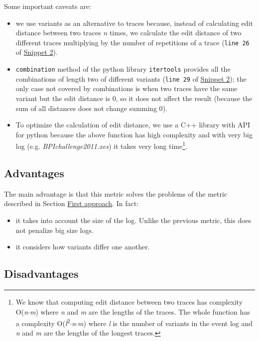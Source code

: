 \documentclass[12pt]{article}
\begin{document}
\noindent Some important caveats are:
\begin{itemize}
	\item we use variants as an alternative to traces because, instead of calculating edit distance between two traces \textit{n} times, we calculate the edit distance of two different traces multiplying by the number of repetitions of a trace (\texttt{line 26} of \hyperref[code:code2]{Snippet 2}).
	\item \texttt{combination} method of the python library \texttt{itertools} provides all the combinations of length two of different variants (\texttt{line 29} of \hyperref[code:code2]{Snippet 2}); the only case not covered by combinations is when two traces have the same variant but the edit distance is 0, so it does not affect the result (because the sum of all distances does not change summing 0).
	\item To optimize the calculation of edit distance, we use a C++ library with API for python because the above function has high complexity and with very big log (e.g. \textit{BPIchallenge2011.xes}) it takes very long time\footnote{We know that computing edit distance between two traces has complexity O(\textit{n$\cdot$m}) where \textit{n} and \textit{m} are the lengths of the traces. The whole function has a complexity O(\textit{l}\textsuperscript{2}$\cdot$\textit{n$\cdot$m}) where \textit{l} is the number of variants in the event log and \textit{n} and \textit{m} are the lengths of the longest traces.}.
\end{itemize}

\subsection*{Advantages}

\noindent The main advantage is that this metric solves the problems of the metric described in Section \hyperref[section:first]{First approach}. In fact:
\begin{itemize}
	\item it takes into account the size of the log. Unlike the previous metric, this does not penalize big size logs.
	\item it considers how variants differ one another.
\end{itemize}

\subsection*{Disadvantages}
\end{document}
